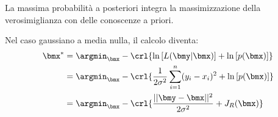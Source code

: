 \documentclass[\main/main.tex]{subfiles}
\begin{document}
La massima probabilità a posteriori integra la massimizzazione della verosimiglianza con delle conoscenze a priori.

Nel caso gaussiano a media nulla, il calcolo diventa:
\begin{align*}
	\bmx^* & = \argmin_{\bmx} -\crl{\ln\left[L(\bmy|\bmx)\right]+\ln\left[p(\bmx)\right]} \\
	       & = \argmin_{\bmx} -\crl{
		\frac{1}{2\sigma^2}\sum_{i=1}^{n} (y_i-x_i)^2+\ln\left[p(\bmx)\right]}                \\
	       & = \argmin_{\bmx} -\crl{\frac{||\bmy-\bmx||^2}{2\sigma^2}+J_R(\bmx)}
\end{align*}
\end{document}
